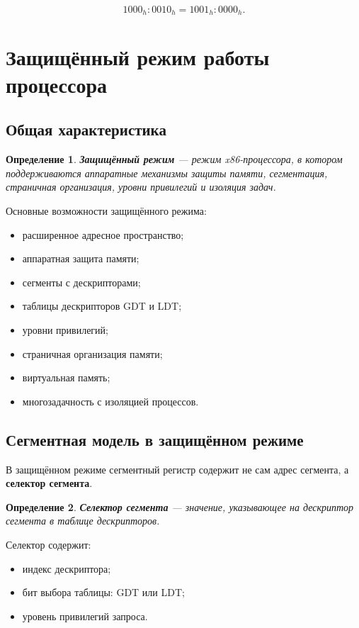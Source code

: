 \documentclass[a4paper,12pt]{article}
\newtheorem{definition}{Определение}
\begin{document}
\[
1000_h:0010_h = 1001_h:0000_h.
\]

\section{Защищённый режим работы процессора}

\subsection{Общая характеристика}

\begin{definition}
\textbf{Защищённый режим} --- режим x86-процессора, в котором поддерживаются аппаратные механизмы защиты памяти, сегментация, страничная организация, уровни привилегий и изоляция задач.
\end{definition}

Основные возможности защищённого режима:

\begin{itemize}
    \item расширенное адресное пространство;
    \item аппаратная защита памяти;
    \item сегменты с дескрипторами;
    \item таблицы дескрипторов GDT и LDT;
    \item уровни привилегий;
    \item страничная организация памяти;
    \item виртуальная память;
    \item многозадачность с изоляцией процессов.
\end{itemize}

\subsection{Сегментная модель в защищённом режиме}

В защищённом режиме сегментный регистр содержит не сам адрес сегмента, а \textbf{селектор сегмента}.

\begin{definition}
\textbf{Селектор сегмента} --- значение, указывающее на дескриптор сегмента в таблице дескрипторов.
\end{definition}

Селектор содержит:

\begin{itemize}
    \item индекс дескриптора;
    \item бит выбора таблицы: GDT или LDT;
    \item уровень привилегий запроса.
\end{itemize}
\end{document}
